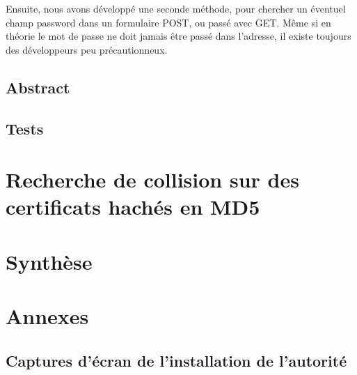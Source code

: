 \documentclass[a4paper,11pt,french]{report}
\begin{document}
Ensuite, nous avons développé une seconde méthode, pour chercher un éventuel champ password
dans un formulaire POST, ou passé avec GET. Même si en théorie le mot de passe ne doit jamais
être passé dans l'adresse, il existe toujours des développeurs peu précautionneux.
\section{Abstract}


\section{Tests}

\chapter{Recherche de collision sur des certificats hachés en MD5}

\chapter{Synthèse}

\chapter{Annexes}

\section{Captures d'écran de l'installation de l'autorité}
\end{document}
